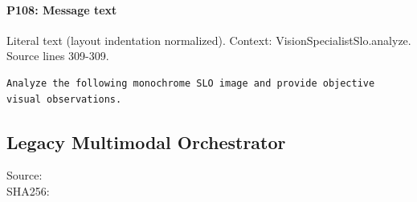 \documentclass[10pt]{article}
\begin{document}
\paragraph{P108: Message text}
Literal text (layout indentation normalized). Context: VisionSpecialistSlo.analyze. Source lines 309-309.
\begin{Verbatim}
Analyze the following monochrome SLO image and provide objective visual observations.
\end{Verbatim}
\subsection{Legacy Multimodal Orchestrator}
Source: \\
SHA256: {\scriptsize{}}
\end{document}
